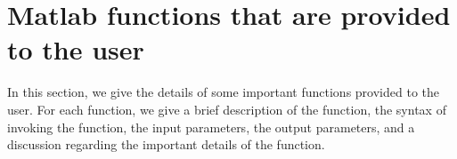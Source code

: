 \documentclass[10pt]{acmtrans2e}
\newcommand{\Matlab}{\textsc{Matlab}}
\newcommand{\function}[1]{\textbf{\texttt{#1}}}
\newcommand{\parameter}[1]{\texttt{#1}}
\begin{document}



\section{Matlab functions that are provided to the user}\label{sec:functions}
In this section, we give the details of some important functions provided to the user. For each function, we give a brief description of the function, the syntax of invoking the function, the input parameters, the output parameters, and a discussion regarding the important details of the function.
\end{document}
